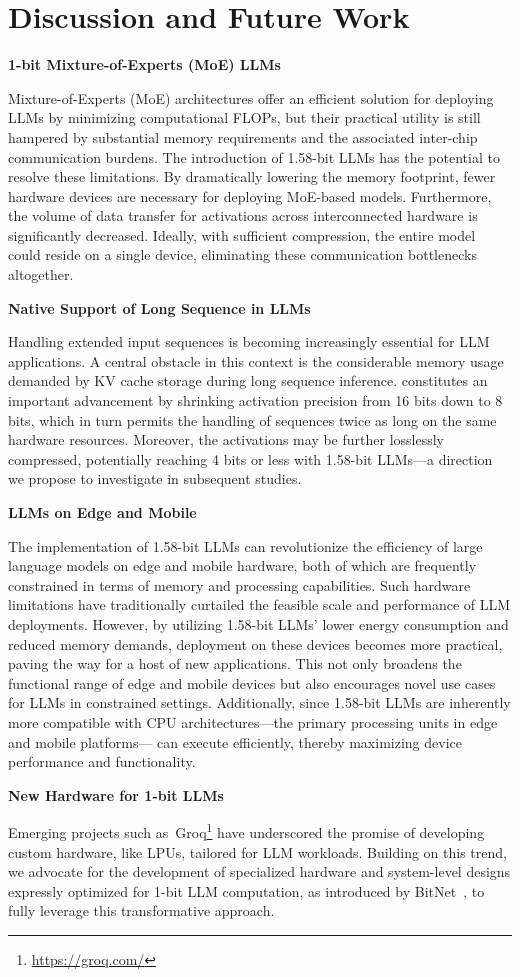 \section{Discussion and Future Work}

\textbf{1-bit Mixture-of-Experts (MoE) LLMs}

Mixture-of-Experts (MoE) architectures offer an efficient solution for deploying LLMs by minimizing computational FLOPs, but their practical utility is still hampered by substantial memory requirements and the associated inter-chip communication burdens. The introduction of 1.58-bit LLMs has the potential to resolve these limitations. By dramatically lowering the memory footprint, fewer hardware devices are necessary for deploying MoE-based models. Furthermore, the volume of data transfer for activations across interconnected hardware is significantly decreased. Ideally, with sufficient compression, the entire model could reside on a single device, eliminating these communication bottlenecks altogether.

\textbf{Native Support of Long Sequence in LLMs}

Handling extended input sequences is becoming increasingly essential for LLM applications. A central obstacle in this context is the considerable memory usage demanded by KV cache storage during long sequence inference.  constitutes an important advancement by shrinking activation precision from 16 bits down to 8 bits, which in turn permits the handling of sequences twice as long on the same hardware resources. Moreover, the activations may be further losslessly compressed, potentially reaching 4 bits or less with 1.58-bit LLMs—a direction we propose to investigate in subsequent studies.

\textbf{LLMs on Edge and Mobile}

The implementation of 1.58-bit LLMs can revolutionize the efficiency of large language models on edge and mobile hardware, both of which are frequently constrained in terms of memory and processing capabilities. Such hardware limitations have traditionally curtailed the feasible scale and performance of LLM deployments. However, by utilizing 1.58-bit LLMs’ lower energy consumption and reduced memory demands, deployment on these devices becomes more practical, paving the way for a host of new applications. This not only broadens the functional range of edge and mobile devices but also encourages novel use cases for LLMs in constrained settings. Additionally, since 1.58-bit LLMs are inherently more compatible with CPU architectures—the primary processing units in edge and mobile platforms— can execute efficiently, thereby maximizing device performance and functionality.

\textbf{New Hardware for 1-bit LLMs}

Emerging projects such as~Groq\footnote{\url{https://groq.com/}} have underscored the promise of developing custom hardware, like LPUs, tailored for LLM workloads. Building on this trend, we advocate for the development of specialized hardware and system-level designs expressly optimized for 1-bit LLM computation, as introduced by BitNet~\cite{bitnet}, to fully leverage this transformative approach.